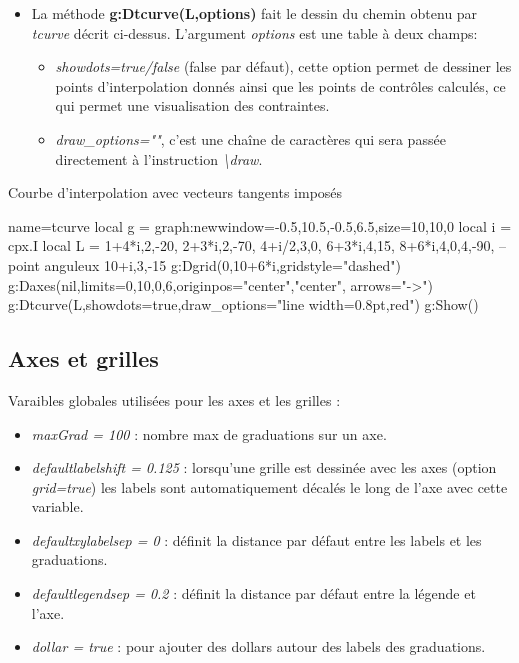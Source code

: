 \begin{itemize}
Deux points consécutifs seront reliés par une courbe de Bézier, la fonction calcule les points de contrôle pour avoir les vecteurs tangents souhaités.

\item La méthode \textbf{g:Dtcurve(L,options)} fait le dessin du chemin obtenu par \emph{tcurve} décrit ci-dessus. L'argument \emph{options} est une table à deux champs:
    \begin{itemize}
        \item \emph{showdots=true/false} (false par défaut), cette option permet de dessiner les points d'interpolation donnés ainsi que les points de contrôles calculés, ce qui permet une visualisation des contraintes.
        \item \emph{draw\_options=""}, c'est une chaîne de caractères qui sera passée directement à l'instruction \emph{\textbackslash draw}.
    \end{itemize}
\end{itemize}

\begin{demo}{Courbe d'interpolation avec vecteurs tangents imposés}
\begin{luadraw}{name=tcurve}
local g = graph:new{window={-0.5,10.5,-0.5,6.5},size={10,10,0}}
local i = cpx.I
local L = {
    1+4*i,{2,-20},
    2+3*i,{2,-70},
    4+i/2,{3,0},
    6+3*i,{4,15},
    8+6*i,{4,0,4,-90}, -- point anguleux
    10+i,{3,-15}}
g:Dgrid({0,10+6*i},{gridstyle="dashed"})
g:Daxes(nil,{limits={{0,10},{0,6}},originpos={"center","center"}, arrows="->"})
g:Dtcurve(L,{showdots=true,draw_options="line width=0.8pt,red"})
g:Show()
\end{luadraw}
\end{demo}


\subsection{Axes et grilles}

Varaibles globales utilisées pour les axes et les grilles :
\begin{itemize}
    \item \emph{maxGrad = 100} : nombre max de graduations sur un axe.
    \item \emph{defaultlabelshift = 0.125} : lorsqu'une grille est dessinée avec les axes (option \emph{grid=true}) les labels sont automatiquement décalés le long de l'axe avec cette variable.
    \item \emph{defaultxylabelsep = 0} : définit la distance par défaut entre les labels et les graduations.
    \item \emph{defaultlegendsep = 0.2} : définit la distance par défaut entre la légende et l'axe.
    \item \emph{dollar = true} :  pour ajouter des dollars autour des labels des graduations.
\end{itemize}


